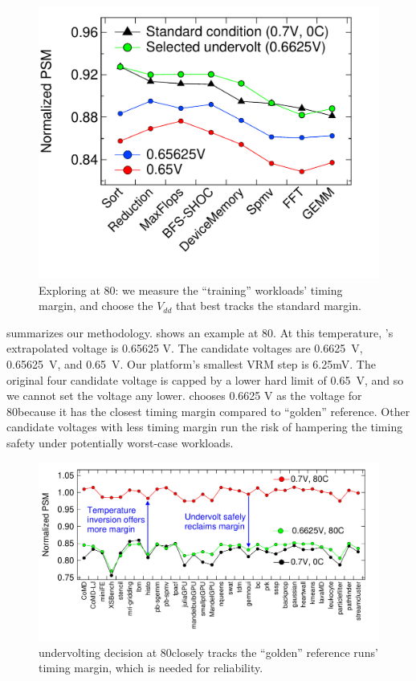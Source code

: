 \begin{figure}[t]
    \centering
    \includegraphics[trim=-30 0 0 0,clip, width=0.7\linewidth]{graphs/temperature/explore-uv-shoc.pdf}
    \caption{Exploring \tistate at 80\C: we measure the ``training'' workloads' timing margin, and choose the $V_{dd}$ that best tracks the standard margin.}
    \label{fig:train-uv}
\end{figure}

 summarizes our methodology.  shows an example at 80\C. At this temperature, 's extrapolated voltage is 0.65625 V. The candidate voltages are 0.6625~V, 0.65625~V, and 0.65~V. Our platform's smallest VRM step is 6.25mV. The original four candidate voltage is capped by a lower hard limit of 0.65~V, and so we cannot set the voltage any lower.  chooses 0.6625 V as the \tistate voltage for 80\C because it has the closest timing margin compared to ``golden'' reference. Other candidate voltages with less timing margin run the risk of hampering the timing safety under potentially worst-case workloads.

\begin{figure}[t]
  \centering
      \includegraphics[trim=0 20 30 15,clip,width=\linewidth]{graphs/temperature/validate-uv.pdf}
      \caption{\tistate undervolting decision at 80\C closely tracks the ``golden'' reference runs' timing margin, which is needed for reliability.}
      \label{fig:validate-uv}
\end{figure}

